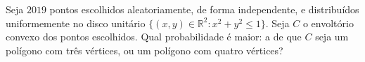 Seja \(2019\) pontos escolhidos aleatoriamente, de forma independente, e distribuídos uniformemente no disco unitário \(\{(x,y)\in\mathbb R^2: x^2+y^2\le 1\}\). Seja \(C\) o envoltório convexo dos pontos escolhidos. Qual probabilidade é maior: a de que \(C\) seja um polígono com três vértices, ou um polígono com quatro vértices?
